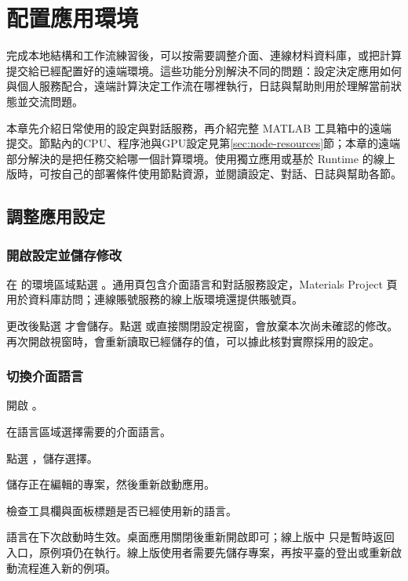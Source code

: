 \chapter{配置應用環境}\label{ch:remote}

完成本地結構和工作流練習後，可以按需要調整介面、連線材料資料庫，或把計算提交給已經配置好的遠端環境。這些功能分別解決不同的問題：設定決定應用如何與個人服務配合，遠端計算決定工作流在哪裡執行，日誌與幫助則用於理解當前狀態並交流問題。

本章先介紹日常使用的設定與對話服務，再介紹完整 MATLAB\regmark{} 工具箱中的遠端提交。節點內的CPU、程序池與GPU設定見第\ref{sec:node-resources}節；本章的遠端部分解決的是把任務交給哪一個計算環境。使用獨立應用或基於 Runtime 的線上版時，可按自己的部署條件使用節點資源，並閱讀設定、對話、日誌與幫助各節。

\section{調整應用設定}

\subsection{開啟設定並儲存修改}

在  的環境區域點選 。通用頁包含介面語言和對話服務設定，Materials Project 頁用於資料庫訪問；連線賬號服務的線上版環境還提供賬號頁。

更改後點選  才會儲存。點選  或直接關閉設定視窗，會放棄本次尚未確認的修改。再次開啟視窗時，會重新讀取已經儲存的值，可以據此核對實際採用的設定。

\subsection{切換介面語言}

\begin{steps}
\item 開啟 。
\item 在語言區域選擇需要的介面語言。
\item 點選 ，儲存選擇。
\item 儲存正在編輯的專案，然後重新啟動應用。
\item 檢查工具欄與面板標題是否已經使用新的語言。
\end{steps}

語言在下次啟動時生效。桌面應用關閉後重新開啟即可；線上版中  只是暫時返回入口，原例項仍在執行。線上版使用者需要先儲存專案，再按平臺的登出或重新啟動流程進入新的例項。

